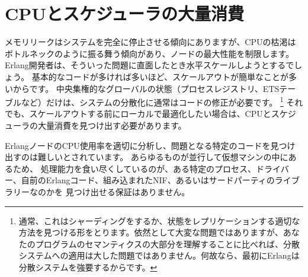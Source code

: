 \chapter{CPUとスケジューラの大量消費}
\label{chap:cpu-hogs}

メモリリークはシステムを完全に停止させる傾向にありますが、CPUの枯渇はボトルネックのように振る舞う傾向があり、ノードの最大性能を制限します。
Erlang開発者は、そういった問題に直面したとき水平スケールしようとするでしょう。
基本的なコードが多ければ多いほど、スケールアウトが簡単なことが多いからです。
中央集権的なグローバルの状態（プロセスレジストリ、ETSテーブルなど）だけは、システムの分散化に通常はコードの修正が必要です。
\footnote{通常、これはシャーディングをするか、状態をレプリケーションする適切な方法を見つける形をとります。依然として大変な問題ではありますが、あなたのプログラムのセマンティクスの大部分を理解することに比べれば、分散システムへの適用は大した問題ではありません。何故なら、最初にErlangは分散システムを強要するからです。}
それでも、スケールアウトする前にローカルで最適化したい場合は、CPUとスケジューラの大量消費を見つけ出す必要があります。

ErlangノードのCPU使用率を適切に分析し、問題となる特定のコードを見つけ出すのは難しいとされています。
あらゆるものが並行して仮想マシンの中にあるため、
処理能力を食い尽くしているのが、ある特定のプロセス、ドライバー、自前のErlangコード、組み込まれたNIF、あるいはサードパーティのライブラリーなのかを
見つけ出せる保証はありません。

